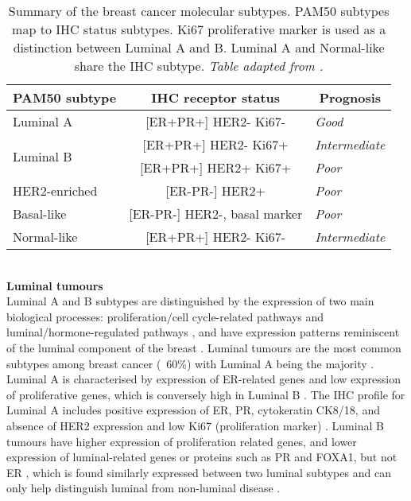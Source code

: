 \begin{table}[!h]
\centering
\caption{Summary of the breast cancer molecular subtypes. PAM50 subtypes map to IHC status subtypes. Ki67 proliferative marker is used as a distinction between Luminal A and B. Luminal A and Normal-like share the IHC subtype. \textit{Table adapted from \cite{Dai2015}.}}
\label{table:pam50summary}
\begin{tabular}{l|c|l}
\multicolumn{1}{c|}{\textbf{PAM50  subtype}} & \textbf{IHC receptor status} & \multicolumn{1}{c}{\textbf{Prognosis}} \\ \hline
\multicolumn{1}{|l|}{Luminal A} & {[}ER+PR+{]} HER2- Ki67- & \multicolumn{1}{l|}{\textit{Good}} \\ \hline
\multicolumn{1}{|l|}{\multirow{2}{*}{Luminal B}} & {[}ER+PR+{]} HER2- Ki67+ & \multicolumn{1}{l|}{\textit{Intermediate}} \\ \cline{2-3} 
\multicolumn{1}{|l|}{} & {[}ER+PR+{]} HER2+ Ki67+ & \multicolumn{1}{l|}{\textit{Poor}} \\ \hline
\multicolumn{1}{|l|}{HER2-enriched} & {[}ER-PR-{]} HER2+ & \multicolumn{1}{l|}{\textit{Poor}} \\ \hline
\multicolumn{1}{|l|}{Basal-like} & {[}ER-PR-{]} HER2-, basal marker & \multicolumn{1}{l|}{\textit{Poor}} \\ \hline
\multicolumn{1}{|l|}{Normal-like} & {[}ER+PR+{]} HER2- Ki67- & \multicolumn{1}{l|}{\textit{Intermediate}} \\ \hline
\end{tabular}
\end{table}\\
    

\textbf{Luminal tumours}\\
Luminal A and B subtypes are distinguished by the expression of two main biological processes: proliferation/cell cycle-related pathways and luminal/hormone-regulated pathways \cite{Vidal2017}, and have expression patterns reminiscent of the luminal component of the breast \cite{perou2000molecular}. Luminal tumours are the most common subtypes among breast cancer (~60\%) with Luminal A being the majority \cite{Dai2015}.  Luminal A is characterised by expression of ER-related genes and low expression of proliferative genes, which is conversely high in Luminal B \cite{eroles2012molecular}. The IHC profile for Luminal A includes positive expression of ER, PR, cytokeratin CK8/18, and absence of HER2 expression and low Ki67 (proliferation marker) \cite{Vidal2017}. Luminal B tumours have higher expression of proliferation related genes, and lower expression of luminal-related genes or proteins such as PR and FOXA1, but not ER \cite{prat2012prognostic}, which is found similarly expressed between two luminal subtypes and can only help distinguish luminal from non-luminal disease \cite{Vidal2017}.

